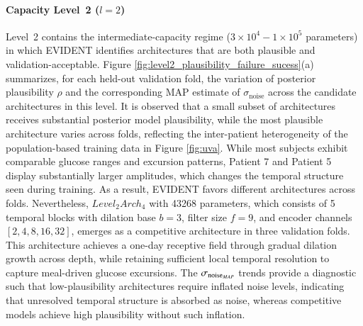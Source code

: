 \documentclass[preprint,12pt]{elsarticle}
\begin{document}
\paragraph{Capacity Level~2 ($l=2$)}
Level~2 contains the intermediate-capacity regime ($3\times10^4 - 1\times10^5$ parameters) in which EVIDENT identifies architectures that are both plausible and validation-acceptable. 
Figure \ref{fig:level2_plausibility_failure_sucess}(a) summarizes, for each held-out validation fold, the variation of posterior plausibility $\rho$ and the corresponding MAP estimate of $\sigma_{\text{noise}}$ across the candidate architectures in this level. It is observed that a small subset of architectures receives substantial posterior model plausibility, while the most plausible architecture varies across folds, reflecting the inter-patient heterogeneity of the population-based training data in Figure \ref{fig:uva}. While most subjects exhibit comparable glucose ranges and excursion patterns, Patient 7 and Patient 5 display substantially larger amplitudes, which changes the temporal structure seen during training. As a result, EVIDENT favors different architectures across folds. Nevertheless, $Level_2Arch_4$ with 43268 parameters, which consists of 5 temporal blocks with dilation base $b=3$, filter size $f=9$, and encoder channels $[2,4,8,16,32]$, emerges as a competitive architecture in three validation folds. This architecture achieves a one-day receptive field through gradual dilation growth across depth, while retaining sufficient local temporal resolution to capture meal-driven glucose excursions.
The $\sigma_{{\rm noise}_{MAP}}$ trends provide a diagnostic such that low-plausibility architectures require inflated noise levels, indicating that unresolved temporal structure is absorbed as noise, whereas competitive models achieve high plausibility without such inflation.
\end{document}
